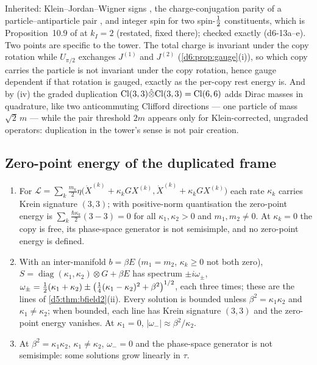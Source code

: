 Inherited: Klein--Jordan--Wigner signs \cite{JordanWigner28}, the charge-conjugation parity of a particle--antiparticle pair
\cite{WeinbergQFT}, and integer spin for two spin-$\tfrac12$ constituents, which is Proposition~10.9 of \cite{ES17} at $k_I=2$ (restated, fixed
there); checked exactly (d6-13a--e). Two points are specific to the tower. The total charge is invariant under the copy rotation while
$U_{\pi/2}$ exchanges $J^{(1)}$ and $J^{(2)}$ (\cref{d6:prop:gauge}(i)), so which copy carries the particle is not invariant under the copy rotation, hence gauge dependent if that rotation is gauged, exactly as the
per-copy rest energy is. And by (iv) the graded duplication $\mathrm{Cl}(3,3)\hat\otimes\mathrm{Cl}(3,3)=\mathrm{Cl}(6,6)$ adds Dirac masses in quadrature, like two
anticommuting Clifford directions --- one particle of mass $\sqrt2\,m$ --- while the pair threshold $2m$ appears only for Klein-corrected,
ungraded operators: duplication in the tower's sense is not pair creation.

\subsection{Zero-point energy of the duplicated frame}
\label{d6:sec:zpe}

\begin{proposition}
\label{d6:prop:zpe}
\begin{enumerate}[label=(\roman*),leftmargin=2.2em]
\item For $\mathcal L=\sum_k\frac{m_k}2\eta\bigl(\dot X^{(k)}+\kappa_kGX^{(k)},\dot X^{(k)}+\kappa_kGX^{(k)}\bigr)$ each rate $\kappa_k$ carries Krein
signature $(3,3)$; with positive-norm quantisation the zero-point energy is $\sum_k\frac{\hbar\kappa_k}2(3-3)=0$ for all $\kappa_1,\kappa_2>0$ and $m_1,m_2\neq0$. At $\kappa_k=0$ the copy is free, its phase-space generator is not semisimple, and no zero-point energy is defined.
\item With an inter-manifold $b=\beta E$ ($m_1=m_2$, $\kappa_k\ge0$ not both zero), $S=\operatorname{diag}(\kappa_1,\kappa_2)\otimes G+\beta E$ has spectrum
$\pm i\omega_\pm$, $\omega_\pm=\tfrac12(\kappa_1+\kappa_2)\pm\bigl(\tfrac14(\kappa_1-\kappa_2)^2+\beta^2\bigr)^{1/2}$, each three times; these are the lines of \cref{d5:thm:bfield2}(ii). Every solution is
bounded unless $\beta^2=\kappa_1\kappa_2$ and $\kappa_1\neq\kappa_2$; when bounded, each line has Krein signature $(3,3)$ and the zero-point energy
vanishes. At $\kappa_1=0$, $|\omega_-|\approx\beta^2/\kappa_2$.
\item At $\beta^2=\kappa_1\kappa_2$, $\kappa_1\neq\kappa_2$, $\omega_-=0$ and the phase-space generator is not semisimple: some solutions grow linearly
in $\tau$.
\end{enumerate}
\end{proposition}


